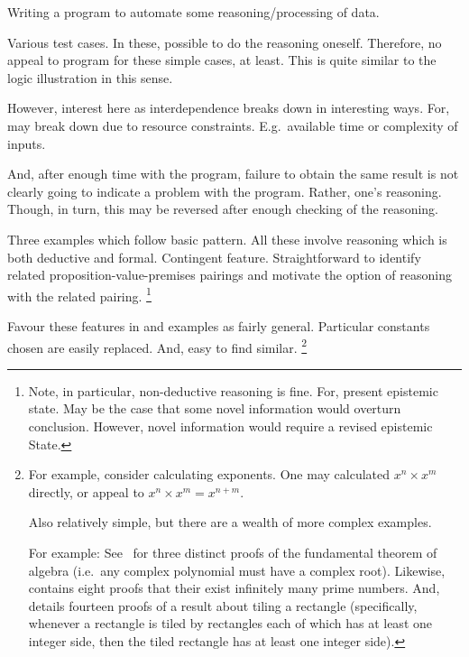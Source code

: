 \begin{note}[Programming]
  \begin{scenario}
    \label{illu:programming}
    Writing a program to automate some reasoning/processing of data.
  \end{scenario}
  Various test cases.
  In these, possible to do the reasoning oneself.
  Therefore, no appeal to program for these simple cases, at least.
  This is quite similar to the logic illustration in this sense.

  However, interest here as interdependence breaks down in interesting ways.
  For, may break down due to resource constraints.
  E.g.\ available time or complexity of inputs.

  And, after enough time with the program, failure to obtain the same result is not clearly going to indicate a problem with the program.
  Rather, one's reasoning.
  Though, in turn, this may be reversed after enough checking of the reasoning.
\end{note}

\begin{note}
  Three examples which follow basic pattern.
  All these involve reasoning which is both deductive and formal.
  Contingent feature.
  Straightforward to identify related proposition-value-premises pairings and motivate the option of reasoning with the related pairing.%
  \footnote{
    Note, in particular, non-deductive reasoning is fine.
    For, present epistemic state.
    May be the case that some novel information would overturn conclusion.
    However, novel information would require a revised epistemic State.
  }

  Favour these features in  and examples as fairly general.
  Particular constants chosen are easily replaced.
  And, easy to find similar.%
  \footnote{
    For example, consider calculating exponents.
    One may calculated \(x^{n} \times x^{m}\) directly, or appeal to \(x^{n} \times x^{m} = x^{n + m}\).

    Also relatively simple, but there are a wealth of more complex examples.

    For example:
    See~\textcite{Fine:1997vc} for three distinct proofs of the fundamental theorem of algebra (i.e.\ any complex polynomial must have a complex root).
    Likewise, \textcite{Ribenboim:2012ts} contains eight proofs that their exist infinitely many prime numbers.
    And, \textcite{Wagon:1987vm} details fourteen proofs of a result about tiling a rectangle (specifically, whenever a rectangle is tiled by rectangles each of which has at least one integer side, then the tiled rectangle has at least one integer side).
  }
\end{note}

